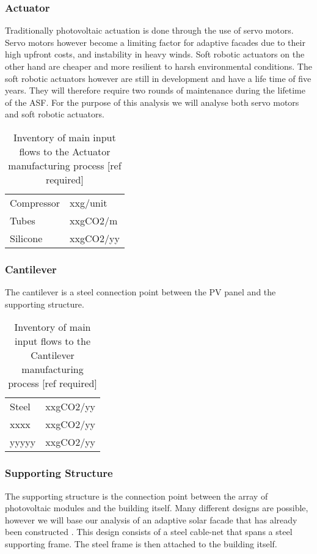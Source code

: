 \subsubsection*{Actuator}
Traditionally photovoltaic actuation is done through the use of servo motors. Servo motors however become a limiting factor for adaptive facades due to their high upfront costs, and instability in heavy winds. Soft robotic actuators on the other hand are cheaper and more resilient to harsh environmental conditions\cite{Svetozarevic2014a}. The soft robotic actuators however are still in development and have a life time of five years. They will therefore require two rounds of maintenance during the lifetime of the ASF.
For the purpose of this analysis we will analyse both servo motors and soft robotic actuators. \\

\begin{table}[H]
\centering
\begin{tabular}{ll}
\hline
Compressor & xxg/unit  \\
Tubes      & xxgCO2/m  \\
Silicone   & xxgCO2/yy \\
\hline
\end{tabular}
\caption{Inventory of main input flows to the Actuator manufacturing process [ref required]}
\label{tab:ActuatorInv}
\end{table}

\subsubsection*{Cantilever}
The cantilever is a steel connection point between the PV panel and the supporting structure.\\

\begin{table}[H]
\centering
\begin{tabular}{ll}
\hline
Steel & xxgCO2/yy \\
xxxx  & xxgCO2/yy \\
yyyyy & xxgCO2/yy \\
\hline
\end{tabular}
\caption{Inventory of main input flows to the Cantilever manufacturing process [ref required]}
\label{tab:CantileverInv}
\end{table}

\subsubsection*{Supporting Structure}
The supporting structure is the connection point between the array of photovoltaic modules and the building itself. Many different designs are possible, however we will base our analysis of an adaptive solar facade that has already been constructed \cite{nagy2015frontiers}. This design consists of a steel cable-net that spans a steel supporting frame. The steel frame is then attached to the building itself.\\

